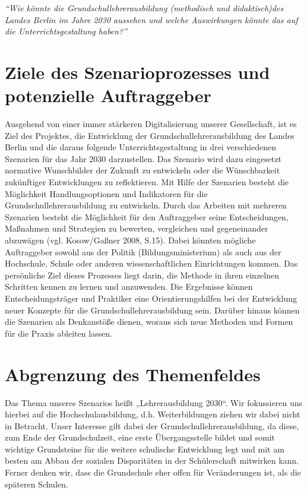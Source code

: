\documentclass[12pt,a4paper]{article}
\begin{document}
\textit{"`Wie könnte die Grundschullehrerausbildung (methodisch und didaktisch)des Landes Berlin im Jahre 2030 aussehen und welche Auswirkungen könnte das auf die Unterrichtsgestaltung haben?"'}

\section{Ziele des Szenarioprozesses und potenzielle Auftraggeber}
Ausgehend von einer immer stärkeren Digitalisierung unserer Gesellschaft, ist es Ziel des Projektes, die Entwicklung der Grundschullehrerausbildung des Landes Berlin und die daraus folgende Unterrichtsgestaltung in drei verschiedenen Szenarien für das Jahr 2030 darzustellen. Das Szenario wird dazu eingesetzt normative Wunschbilder der Zukunft zu entwickeln oder die Wünschbarkeit zukünftiger Entwicklungen zu reflektieren. Mit Hilfe der Szenarien besteht die Möglichkeit Handlungsoptionen und Indikatoren für die Grundschullehrerausbildung zu entwickeln. Durch das Arbeiten mit mehreren Szenarien besteht die Möglichkeit für den Auftraggeber seine Entscheidungen, Maßnahmen und Strategien zu bewerten, vergleichen und gegeneinander abzuwägen (vgl. Kosow/Gaßner 2008, S.15)\cite{Kosow2008}. Dabei könnten mögliche Auftraggeber sowohl aus der Politik (Bildungsministerium) als auch aus der Hochschule, Schule oder anderen wissenschaftlichen Einrichtungen kommen.
Das persönliche Ziel dieses Prozesses liegt darin, die Methode in ihren einzelnen Schritten kennen zu lernen und anzuwenden.
Die Ergebnisse können Entscheidungsträger und Praktiker eine Orientierungshilfen bei der Entwicklung neuer Konzepte für die Grundschullehrerausbildung sein. Darüber hinaus können die Szenarien als Denkanstöße dienen, woraus sich neue Methoden und Formen für die Praxis ableiten lassen.

\section{Abgrenzung des Themenfeldes}
Das Thema unseres Szenarios heißt „Lehrerausbildung 2030“. Wir fokussieren uns hierbei auf die Hochschulausbildung, d.h. Weiterbildungen ziehen wir dabei nicht in Betracht. Unser Interesse gilt dabei der Grundschullehrerausbildung, da diese, zum Ende der Grundschulzeit, eine erste Übergangsstelle bildet und somit wichtige Grundsteine für die weitere schulische Entwicklung legt und mit am besten am Abbau der sozialen Disparitäten in der Schülerschaft mitwirken kann. Ferner denken wir, dass die Grundschule eher offen für Veränderungen ist, als die späteren Schulen.
\end{document}
